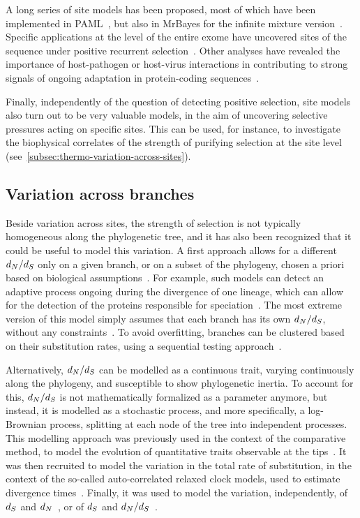 A long series of site models has been proposed, most of which have been implemented in PAML~\citep{Yang1997a,Yang2007}, but also in MrBayes for the infinite mixture version~\citep{Huelsenbeck2001, Ronquist2012}.
Specific applications at the level of the entire exome have uncovered sites of the sequence under positive recurrent selection~\citep{kosiol_patterns_2008}.
Other analyses have revealed the importance of host-pathogen or host-virus interactions in contributing to strong signals of ongoing adaptation in protein-coding sequences~\citep{Enard2016}.

Finally, independently of the question of detecting positive selection, site models also turn out to be very valuable models, in the aim of uncovering selective pressures acting on specific sites.
This can be used, for instance, to investigate the biophysical correlates of the strength of purifying selection at the site level (see~\ref{subsec:thermo-variation-across-sites}).

\subsection{Variation across branches}
\label{subsec:variation-across-branches}

Beside variation across sites, the strength of selection is not typically homogeneous along the phylogenetic tree, and it has also been recognized that it could be useful to model this variation.
A first approach allows for a different $d_N / d_S$ only on a given branch, or on a subset of the phylogeny, chosen a priori based on biological assumptions~\citep{Yang1998}.
For example, such models can detect an adaptive process ongoing during the divergence of one lineage, which can allow for the detection of the proteins responsible for speciation~\citep{Yang1998, Zhang2004}.
The most extreme version of this model simply assumes that each branch has its own $d_N / d_S$, without any constraints~\citep{Popadin2007}.
To avoid overfitting, branches can be clustered based on their substitution rates, using a sequential testing approach~\citep{Dutheil2012}.

Alternatively, $d_N / d_S$ can be modelled as a continuous trait, varying continuously along the phylogeny, and susceptible to show phylogenetic inertia.
To account for this, $d_N / d_S$ is not mathematically formalized as a parameter anymore, but instead, it is modelled as a stochastic process, and more specifically, a log-Brownian process, splitting at each node of the tree into independent processes.
This modelling approach was previously used in the context of the comparative method, to model the evolution of quantitative traits observable at the tips~\citep{Felsenstein1985, Huelsenbeck2003}.
It was then recruited to model the variation in the total rate of substitution, in the context of the so-called auto-correlated relaxed clock models, used to estimate divergence times~\citep{Thorne1998}.
Finally, it was used to model the variation, independently, of $d_S$ and $d_N$~\citep{Seo2004}, or of $d_S$ and $d_N / d_S$~\citep{Lartillot2011}.

